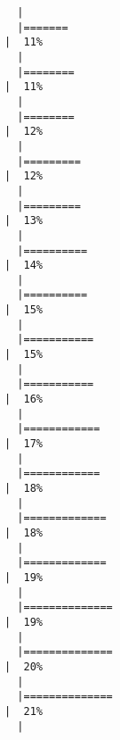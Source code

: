 \documentclass[
  letterpaper,
]{book}
\begin{document}
\begin{verbatim}
  |                                                                            
  |=======                                                               |  11%
  |                                                                            
  |========                                                              |  11%
  |                                                                            
  |========                                                              |  12%
  |                                                                            
  |=========                                                             |  12%
  |                                                                            
  |=========                                                             |  13%
  |                                                                            
  |==========                                                            |  14%
  |                                                                            
  |==========                                                            |  15%
  |                                                                            
  |===========                                                           |  15%
  |                                                                            
  |===========                                                           |  16%
  |                                                                            
  |============                                                          |  17%
  |                                                                            
  |============                                                          |  18%
  |                                                                            
  |=============                                                         |  18%
  |                                                                            
  |=============                                                         |  19%
  |                                                                            
  |==============                                                        |  19%
  |                                                                            
  |==============                                                        |  20%
  |                                                                            
  |==============                                                        |  21%
  |                                                                            

\end{verbatim}
\end{document}
